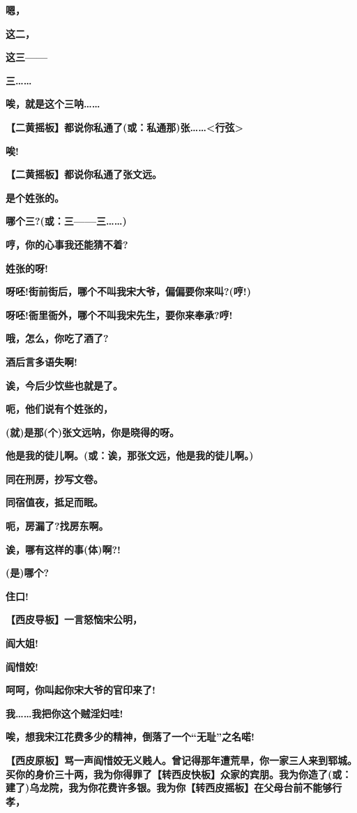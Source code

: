 \textbf{嗯，}

\textbf{这二，}

\textbf{这三------}

\textbf{三\ldots{}\ldots{}}

\textbf{唉，就是这个三呐\ldots{}\ldots{}}

\textbf{【二黄摇板】都说你私通了(或：私通那)张\ldots{}\ldots{}\textless{}行弦\textgreater{}}

\textbf{唉!}

\textbf{【二黄摇板】都说你私通了张文远。}

\textbf{是个姓张的。}

\textbf{哪个三?(或：三------三\ldots{}\ldots{})}

\textbf{哼，你的心事我还能猜不着?}

\textbf{姓张的呀!}

\textbf{呀呸!街前街后，哪个不叫我宋大爷，偏偏要你来叫?(哼!)}

\textbf{呀呸!衙里衙外，哪个不叫我宋先生，要你来奉承?哼!}

\textbf{哦，怎么，你吃了酒了?}

\textbf{酒后言多语失啊!}

\textbf{诶，今后少饮些也就是了。}

\textbf{呃，他们说有个姓张的，}

\textbf{(就)是那(个)张文远呐，你是晓得的呀。}

\textbf{他是我的徒儿啊。(或：诶，那张文远，他是我的徒儿啊。)}

\textbf{同在刑房，抄写文卷。}

\textbf{同宿值夜，抵足而眠。}

\textbf{呃，房漏了?找房东啊。}

\textbf{诶，哪有这样的事(体)啊?!}

\textbf{(是)哪个?}

\textbf{住口!}

\textbf{【西皮导板】一言怒恼宋公明，}

\textbf{阎大姐!}

\textbf{阎惜姣!}

\textbf{呵呵，你叫起你宋大爷的官印来了!}

\textbf{我\ldots{}\ldots{}我把你这个贼淫妇哇!}

\textbf{唉，想我宋江花费多少的精神，倒落了一个``无耻''之名喏!}

\textbf{【西皮原板】骂一声阎惜姣无义贱人。曾记得那年遭荒旱，你一家三人来到郓城。买你的身价三十两，我为你得罪了【转西皮快板】众家的宾朋。我为你造了(或：建了)乌龙院，我为你花费许多银。我为你【转西皮摇板】在父母台前不能够行孝，}

